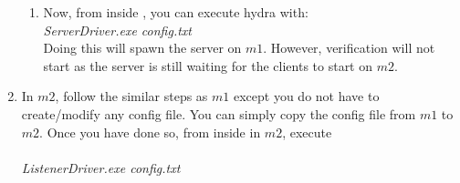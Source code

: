 \documentclass{article}
\begin{document}
\begin{enumerate}
\begin{enumerate}
    \item Now, from inside , you can execute hydra with:\\
    \textit{ServerDriver.exe config.txt}\\
    Doing this will spawn the server on $m1$. However, verification will not start as the server is still waiting for the clients to start on $m2$.
  \end{enumerate}
  \item In $m2$, follow the similar steps as $m1$ except you do not have to create/modify any config file. You can simply copy the config file from $m1$ to $m2$. Once you have done so, from inside  in $m2$, execute\\
      \\
      \textit{ListenerDriver.exe config.txt}
\end{enumerate}
\end{document}
